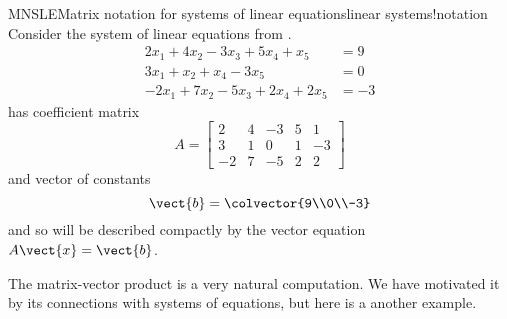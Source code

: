 %
\begin{example}{MNSLE}{Matrix notation for systems of linear equations}{linear systems!notation}
Consider the system of linear equations from .
%
\begin{align*}
2x_1+4x_2-3x_3+5x_4+x_5&=9\\
3x_1+x_2+x_4-3x_5&=0\\
-2x_1+7x_2-5x_3+2x_4+2x_5&=-3
\end{align*}
%
has coefficient matrix
%
\begin{equation*}
A=
\begin{bmatrix}
2 & 4 & -3 & 5 & 1\\
3 & 1 & 0 & 1 & -3\\
-2 & 7 & -5 & 2 & 2
\end{bmatrix}
\end{equation*}
%
and vector of constants
%
\begin{equation*}
\vect{b}=\colvector{9\\0\\-3}
\end{equation*}
%
and so will be described compactly by the vector equation $A\vect{x}=\vect{b}$.
%
\end{example}
%
The matrix-vector product is a very natural computation.  We have motivated it by its connections with systems of equations, but here is a another example.
%
